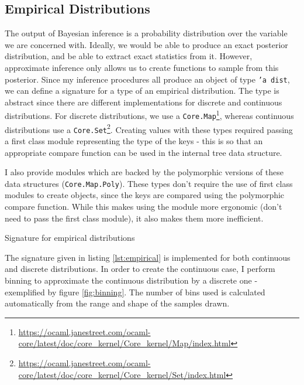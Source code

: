 \subsection{Empirical Distributions}

The output of Bayesian inference is a probability distribution over the variable we are concerned with. Ideally, we would be able to produce an exact posterior distribution, and be able to extract exact statistics from it. However, approximate inference only allows us to create functions to sample from this posterior. Since my inference procedures all produce an object of type \texttt{'a dist}, we can define a signature for a type of an empirical distribution. The type is abstract since there are different implementations for discrete and continuous distributions. For discrete distributions, we use a \texttt{Core.Map}\footnote{\url{https://ocaml.janestreet.com/ocaml-core/latest/doc/core_kernel/Core_kernel/Map/index.html}}, whereas continuous distributions use a \texttt{Core.Set}\footnote{\url{https://ocaml.janestreet.com/ocaml-core/latest/doc/core_kernel/Core_kernel/Set/index.html}}. Creating values with these types required passing a first class module representing the type of the keys - this is so that an appropriate compare function can be used in the internal tree data structure.
	
I also provide modules which are backed by the polymorphic versions of these data structures (\texttt{Core.Map.Poly}). These types don't require the use of first class modules to create objects, since the keys are compared using the polymorphic compare function. While this makes using the module more ergonomic (don't need to pass the first class module), it also makes them more inefficient.


\begin{listing}[ht]
	\caption{Signature for empirical distributions}
	\label{lst:empirical}
\end{listing}

The signature given in listing \ref{lst:empirical} is implemented for both continuous and discrete distributions. In order to create the continuous case, I perform binning to approximate the continuous distribution by a discrete one - exemplified by figure \ref{fig:binning}. The number of bins used is calculated automatically from the range and shape of the samples drawn.

